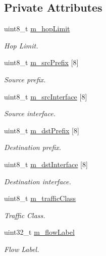 \subsection*{Private Attributes}
\begin{DoxyCompactItemize}
\item 
uint8\+\_\+t \hyperlink{classns3_1_1SixLowPanHc1_a71d14478bd11b38fb03bb0cd867c69e6}{m\+\_\+hop\+Limit}
\begin{DoxyCompactList}\small\item\em Hop Limit. \end{DoxyCompactList}\item 
uint8\+\_\+t \hyperlink{classns3_1_1SixLowPanHc1_a788a1b87fea6ebcec096c0092c2a6d6d}{m\+\_\+src\+Prefix} \mbox{[}8\mbox{]}
\begin{DoxyCompactList}\small\item\em Source prefix. \end{DoxyCompactList}\item 
uint8\+\_\+t \hyperlink{classns3_1_1SixLowPanHc1_a2b947076c7588c931ad13825c055d1c5}{m\+\_\+src\+Interface} \mbox{[}8\mbox{]}
\begin{DoxyCompactList}\small\item\em Source interface. \end{DoxyCompactList}\item 
uint8\+\_\+t \hyperlink{classns3_1_1SixLowPanHc1_a2c5f175690fd1e3269f98a9e0ed7b845}{m\+\_\+dst\+Prefix} \mbox{[}8\mbox{]}
\begin{DoxyCompactList}\small\item\em Destination prefix. \end{DoxyCompactList}\item 
uint8\+\_\+t \hyperlink{classns3_1_1SixLowPanHc1_a0a7ab918acbe446789351947e471b2ed}{m\+\_\+dst\+Interface} \mbox{[}8\mbox{]}
\begin{DoxyCompactList}\small\item\em Destination interface. \end{DoxyCompactList}\item 
uint8\+\_\+t \hyperlink{classns3_1_1SixLowPanHc1_aec4705ba6a7ea59f42d6946622ed014a}{m\+\_\+traffic\+Class}
\begin{DoxyCompactList}\small\item\em Traffic Class. \end{DoxyCompactList}\item 
uint32\+\_\+t \hyperlink{classns3_1_1SixLowPanHc1_a58aef463f400932cf4e4decff6d79fce}{m\+\_\+flow\+Label}
\begin{DoxyCompactList}\small\item\em Flow Label. \end{DoxyCompactList}\item 

\end{DoxyCompactItemize}

